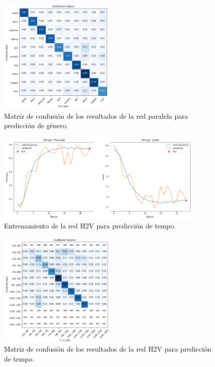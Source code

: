 \begin{figure}[!ht]
  \centering
  \includegraphics[width=0.5\textwidth]{Figures/confusion_genero_split.png}
  \caption{\textcolor{black}{Matriz de confusión de los resultados de la red paralela para predicción de género}.}
  \label{Fig:confusion_genero_split}
\end{figure}


\begin{figure}[!ht]
  \centering
  \includegraphics[width=0.9\textwidth]{Figures/entrenamiento_tempo_H2V.png}
  \caption{\textcolor{black}{Entrenamiento de la red H2V para predicción de tempo}.}
  \label{Fig:entrenamiento_tempo_H2V}
\end{figure}

\begin{figure}[!ht]
  \centering
  \includegraphics[width=0.5\textwidth]{Figures/confusion_tempo_H2V.png}
  \caption{\textcolor{black}{Matriz de confusión de los resultados de la red H2V para predicción de tempo}.}
  \label{Fig:confusion_tempo_H2V}
\end{figure}

